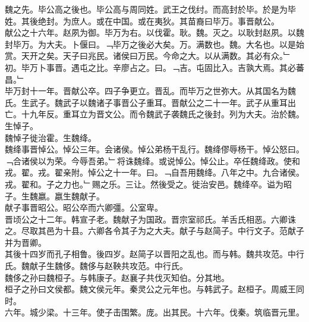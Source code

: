 \documentclass{zhvt-classic}
\begin{document}

\hspace*{2em}魏之先。毕公高之後也。毕公高与周同姓。武王之伐纣。而高封於毕。於是为毕姓。其後绝封。为庶人。或在中国。或在夷狄。其苗裔曰毕万。事晋献公。\\
\hspace*{2em}献公之十六年。赵夙为御。毕万为右。以伐霍。耿。魏。灭之。以耿封赵夙。以魏封毕万。为大夫。卜偃曰。﹁毕万之後必大矣。万。满数也。魏。大名也。以是始赏。天开之矣。天子曰兆民。诸侯曰万民。今命之大。以从满数。其必有众。﹂初。毕万卜事晋。遇屯之比。辛廖占之。曰。﹁吉。屯固比入。吉孰大焉。其必蕃昌。﹂\\
\hspace*{2em}毕万封十一年。晋献公卒。四子争更立。晋乱。而毕万之世弥大。从其国名为魏氏。生武子。魏武子以魏诸子事晋公子重耳。晋献公之二十一年。武子从重耳出亡。十九年反。重耳立为晋文公。而令魏武子袭魏氏之後封。列为大夫。治於魏。生悼子。\\
\hspace*{2em}魏悼子徙治霍。生魏绛。\\
\hspace*{2em}魏绛事晋悼公。悼公三年。会诸侯。悼公弟杨干乱行。魏绛僇辱杨干。悼公怒曰。﹁合诸侯以为荣。今辱吾弟。﹂将诛魏绛。或说悼公。悼公止。卒任魏绛政。使和戎。翟。戎。翟亲附。悼公之十一年。曰。﹁自吾用魏绛。八年之中。九合诸侯。戎。翟和。子之力也。﹂赐之乐。三让。然後受之。徙治安邑。魏绛卒。谥为昭子。生魏嬴。嬴生魏献子。\\
\hspace*{2em}献子事晋昭公。昭公卒而六卿彊。公室卑。\\
\hspace*{2em}晋顷公之十二年。韩宣子老。魏献子为国政。晋宗室祁氏。羊舌氏相恶。六卿诛之。尽取其邑为十县。六卿各令其子为之大夫。献子与赵简子。中行文子。范献子并为晋卿。\\
\hspace*{2em}其後十四岁而孔子相鲁。後四岁。赵简子以晋阳之乱也。而与韩。魏共攻范。中行氏。魏献子生魏侈。魏侈与赵鞅共攻范。中行氏。\\
\hspace*{2em}魏侈之孙曰魏桓子。与韩康子。赵襄子共伐灭知伯。分其地。\\
\hspace*{2em}桓子之孙曰文侯都。魏文侯元年。秦灵公之元年也。与韩武子。赵桓子。周威王同时。\\
\hspace*{2em}六年。城少梁。十三年。使子击围繁。庞。出其民。十六年。伐秦。筑临晋元里。\\
\end{document}
